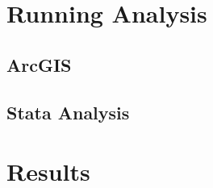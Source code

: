 \documentclass[12pt]{article}
\begin{document}
\section{Running Analysis}
\label{Data Manipulation and Analysis}

\subsection{ArcGIS}

\label{Analysis}

\subsection{Stata Analysis}

\section{Results}
\end{document}
